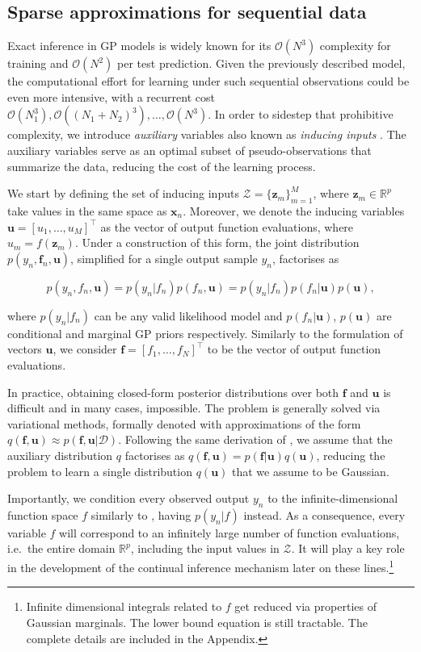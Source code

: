 \documentclass[]{article}
\def\u{{\mathbf u}}
\def\f{{\mathbf f}}
\newcommand{\Zcal}{\mathcal{Z}}
\newcommand{\Dcal}{\mathcal{D}}
\newcommand{\xc}{\bm{x}}
\newcommand{\zc}{\bm{z}}
\begin{document}
\subsection{Sparse approximations for sequential data}

Exact inference in GP models is widely known for its $\mathcal{O}(N^3)$ complexity for training and $\mathcal{O}(N^2)$ per test prediction. Given the previously described model, the computational effort for learning under such sequential observations could be even more intensive, with a recurrent cost $\mathcal{O}(N_1^3), \mathcal{O}((N_1 + N_2)^3) ,\dots, \mathcal{O}(N^3)$.  In order to sidestep that prohibitive complexity, we introduce \textit{auxiliary} variables also known as \textit{inducing inputs} \citep{snelson2006sparse}. The auxiliary variables serve as an optimal subset of pseudo-observations that summarize the data, reducing the cost of the learning process.

We start by defining the set of inducing inputs $\Zcal = \{\zc_m\}^M_{m=1}$, where $\zc_m \in \mathbb{R}^p$ take values in the same space as $\xc_n$. Moreover, we denote the inducing variables $\u = [u_1, \dots, u_M]^\top$ as the vector of output function evaluations, where $u_m = f(\zc_m)$. Under a construction of this form, the joint distribution $p(y_n, \f_n, \u)$, simplified for a single output sample $y_n$, factorises as

\begin{equation}
	p(y_n, f_n, \u) = p(y_n| f_n)p(f_n, \u) = p(y_n| f_n)p(f_n| \u)p(\u) ,
\end{equation}

where $p(y_n| f_n)$ can be any valid likelihood model and $p(f_n| \u)$, $p(\u)$ are conditional and marginal GP priors respectively. Similarly to the formulation of vectors $\u$, we consider $\f = [f_1, \dots, f_N]^\top$ to be the vector of output function evaluations. 

In practice, obtaining closed-form posterior distributions over both $\f$ and $\u$ is difficult and in many cases, impossible. The problem is generally solved via variational methods, formally denoted with approximations of the form $q(\f, \u) \approx p(\f,\u | \Dcal)$. Following the same derivation of \citet{titsias2009variational}, we assume that the auxiliary distribution $q$ factorises as $q(\f,\u) = p(\f|\u)q(\u)$, reducing the problem to learn a single distribution $q(\u)$ that we assume to be Gaussian.

Importantly, we condition every observed output $y_n$ to the infinite-dimensional function space $f$ similarly to \citet{bui2017unifying}, having $p(y_n| f)$ instead. As a consequence, every variable $f$ will correspond to an infinitely large number of function evaluations, i.e.\ the entire domain $\mathbb{R}^p$, including the input values in $\Zcal$. It will play a key role in the development of the continual inference mechanism later on these lines.\footnote{Infinite dimensional integrals related to $f$ get reduced via properties of Gaussian marginals. The lower bound equation is still tractable. The complete details are included in the Appendix.}
\end{document}
